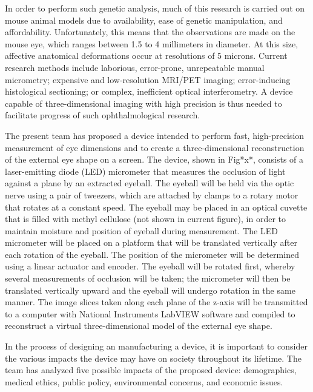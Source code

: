 \documentclass{article}
\begin{document}
In order to perform such genetic analysis, much of this research is carried out on mouse animal models due to availability, ease of genetic manipulation, and affordability\cite{schaeffel04}. Unfortunately, this means that the observations are made on the mouse eye, which ranges between 1.5 to 4 millimeters in diameter. At this size, affective anatomical deformations occur at resolutions of 5 microns. Current research methods include laborious, error-prone, unrepeatable manual micrometry\cite{wallman04}; expensive and low-resolution MRI/PET imaging\cite{atchison04}; error-inducing histological sectioning\cite{schaeffel04}; or complex, inefficient optical interferometry\cite{guggenheim04,schaeffel04}. A device capable of three-dimensional imaging with high precision is thus needed to facilitate progress of such ophthalmological research.

The present team has proposed a device intended to perform fast, high-precision measurement of eye dimensions and to create a three-dimensional reconstruction of the external eye shape on a screen. The device, shown in Fig*x*, consists of a laser-emitting diode (LED) micrometer that measures the occlusion of light against a plane by an extracted eyeball. The eyeball will be held via the optic nerve using a pair of tweezers, which are attached by clamps to a rotary motor that rotates at a constant speed. The eyeball may be placed in an optical cuvette that is filled with methyl cellulose (not shown in current figure), in order to maintain moisture and position of eyeball during measurement. The LED micrometer will be placed on a platform that will be translated vertically after each rotation of the eyeball. The position of the micrometer will be determined using a linear actuator and encoder. The eyeball will be rotated first, whereby several measurements of occlusion will be taken; the micrometer will then be translated vertically upward and the eyeball will undergo rotation in the same manner. The image slices taken along each plane of the z-axis will be transmitted to a computer with National Instruments LabVIEW software and compiled to reconstruct a virtual three-dimensional model of the external eye shape. 

In the process of designing an manufacturing a device, it is important to consider the various impacts the device may have on society throughout its lifetime. The team has analyzed five possible impacts of the proposed device: demographics, medical ethics, public policy, environmental concerns, and economic issues. 
\end{document}
